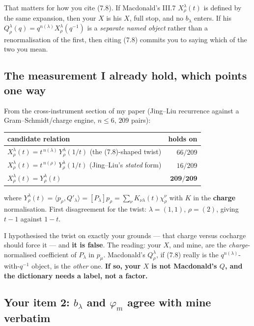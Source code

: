 \documentclass[11pt]{article}
\begin{document}
That matters for how you cite (7.8). If Macdonald's III.7 $X^{\lambda}_{\rho}(t)$ is defined by the
same expansion, then your $X$ is his $X$, full stop, and no $b_\lambda$ enters. If his
$Q^{\lambda}_{\rho}(q)=q^{n(\lambda)}X^{\lambda}_{\rho}(q^{-1})$ is a \emph{separate named object}
rather than a renormalisation of the first, then citing (7.8) commits you to saying which of the two
you mean.

\subsection*{The measurement I already hold, which points one way}

From the cross-instrument section of my paper (Jing--Liu recurrence against a Gram--Schmidt/charge
engine, $n\le6$, $209$ pairs):
\begin{center}
\begin{tabular}{lr}
\toprule
candidate relation & holds on \\
\midrule
$X^{\lambda}_{\rho}(t)=t^{\,n(\lambda)}\,Y^{\lambda}_{\rho}(1/t)$ \quad(the (7.8)-shaped twist) & $66/209$ \\
$X^{\lambda}_{\rho}(t)=t^{\,n(\rho)}\,Y^{\lambda}_{\rho}(1/t)$ \quad(Jing--Liu's \emph{stated} form) & $16/209$ \\
$X^{\lambda}_{\rho}(t)=Y^{\lambda}_{\rho}(t)$ & $\mathbf{209/209}$ \\
\bottomrule
\end{tabular}
\end{center}
where $Y^{\lambda}_{\rho}(t)=\langle p_\rho,Q'_\lambda\rangle=[P_\lambda]p_\rho=\sum_\nu
K_{\nu\lambda}(t)\chi^{\nu}_{\rho}$ with $K$ in the \textbf{charge} normalisation. First
disagreement for the twist: $\lambda=(1,1)$, $\rho=(2)$, giving $t-1$ against $1-t$.

I hypothesised the twist on exactly your grounds --- that charge versus cocharge should force it ---
and \textbf{it is false}. The reading: your $X$, and mine, are the \emph{charge}-normalised
coefficient of $P_\lambda$ in $p_\mu$. Macdonald's $Q^{\lambda}_{\rho}$, if (7.8) really is the
$q^{n(\lambda)}$-with-$q^{-1}$ object, is the \emph{other} one. \textbf{If so, your $X$ is not
Macdonald's $Q$, and the dictionary needs a label, not a factor.}

\subsection*{Your item 2: $b_\lambda$ and $\varphi_m$ agree with mine verbatim}
\end{document}

